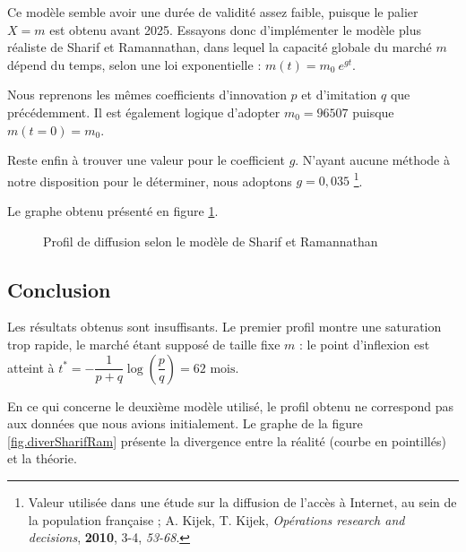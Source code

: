 		Ce modèle semble avoir une durée de validité assez faible, puisque le palier $X = m$ est obtenu avant 2025. Essayons donc d'implémenter le modèle plus réaliste de Sharif et Ramannathan, dans lequel la capacité globale du marché $m$ dépend du temps, selon une loi exponentielle : $m(t) = m_0\ e^{gt}$.
		
		Nous reprenons les mêmes coefficients d'innovation $p$ et d'imitation $q$ que précédemment. Il est également logique d'adopter $m_0 = 96507$ puisque $m(t = 0) = m_0$.
		
		Reste enfin à trouver une valeur pour le coefficient $g$. N'ayant aucune méthode à notre disposition pour le déterminer, nous adoptons $g = 0,035$ \footnote{Valeur utilisée dans une étude sur la diffusion de l'accès à Internet, au sein de la population française ; A. Kijek, T. Kijek, \textit{Opérations research and decisions}, \textbf{2010}, 3-4, \textit{53-68}.}.
		
		Le graphe obtenu présenté en figure \ref{fig.SharifRaman}.
		
		\begin{figure}[h!]
			\caption{Profil de diffusion selon le modèle de Sharif et Ramannathan \label{fig.SharifRaman}}
			\begin{center}
			\end{center}
		\end{figure}
		
	\subsection{Conclusion}
		
		Les résultats obtenus sont insuffisants. Le premier profil montre une saturation trop rapide, le marché étant supposé de taille fixe $m$ : le point d'inflexion est atteint à $t^* = -\dfrac{1}{p+q} \log{\left(\dfrac{p}{q}\right)} = 62 \text{ mois}$.
		
		En ce qui concerne le deuxième modèle utilisé, le profil obtenu ne correspond pas aux données que nous avions initialement. Le graphe de la figure \ref{fig.diverSharifRam} présente la divergence entre la réalité (courbe en pointillés) et la théorie.
		
